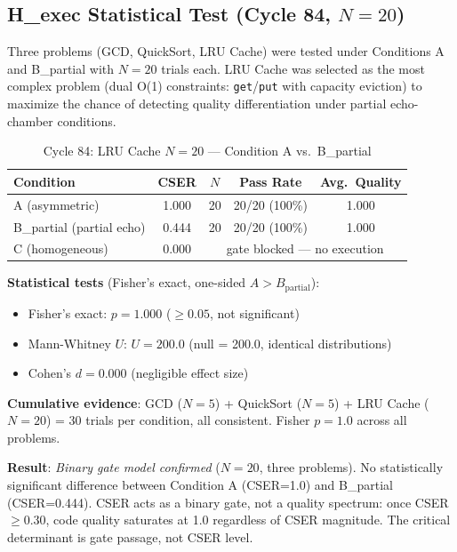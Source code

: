 \documentclass[12pt]{article}
\begin{document}
\subsection{H\_exec Statistical Test (Cycle 84, $N=20$)}

Three problems (GCD, QuickSort, LRU Cache) were tested under Conditions A and B\_partial
with $N=20$ trials each. LRU Cache was selected as the most complex problem
(dual O(1) constraints: \texttt{get}/\texttt{put} with capacity eviction)
to maximize the chance of detecting quality differentiation under partial echo-chamber conditions.

\begin{table}[h]
\centering
\caption{Cycle 84: LRU Cache $N=20$ — Condition A vs.\ B\_partial}
\begin{tabular}{lcccc}
\toprule
Condition & CSER & $N$ & Pass Rate & Avg.\ Quality \\
\midrule
A (asymmetric) & 1.000 & 20 & 20/20 (100\%) & 1.000 \\
B\_partial (partial echo) & 0.444 & 20 & 20/20 (100\%) & 1.000 \\
C (homogeneous) & 0.000 & \multicolumn{3}{c}{gate blocked — no execution} \\
\bottomrule
\end{tabular}
\end{table}

\noindent\textbf{Statistical tests} (Fisher's exact, one-sided $A > B_\text{partial}$):

\begin{itemize}
  \item Fisher's exact: $p = 1.000$ ($\geq 0.05$, not significant)
  \item Mann-Whitney $U$: $U = 200.0$ (null = 200.0, identical distributions)
  \item Cohen's $d = 0.000$ (negligible effect size)
\end{itemize}

\noindent\textbf{Cumulative evidence}: GCD ($N=5$) + QuickSort ($N=5$) + LRU Cache ($N=20$)
= 30 trials per condition, all consistent. Fisher $p = 1.0$ across all problems.

\noindent\textbf{Result}: \textit{Binary gate model confirmed} ($N=20$, three problems).
No statistically significant difference between Condition A (CSER=1.0) and
B\_partial (CSER=0.444). CSER acts as a binary gate, not a quality spectrum:
once CSER $\geq 0.30$, code quality saturates at 1.0 regardless of CSER magnitude.
The critical determinant is gate passage, not CSER level.
\end{document}
